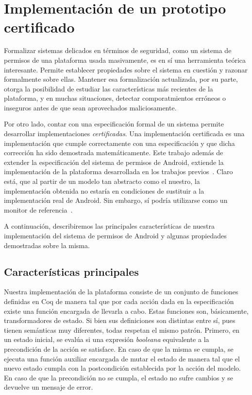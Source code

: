 \chapter{Implementación de un prototipo certificado}
\label{chapter:implementation}
Formalizar sistemas delicados en términos de seguridad, como un sistema de permisos de una
plataforma usada masivamente, es en sí una herramienta teórica interesante. Permite establecer
propiedades sobre el sistema en cuestión y razonar formalmente sobre ellas. Mantener esa
formalización actualizada, por su parte, otorga la posibilidad de estudiar las características más
recientes de la plataforma, y en muchas situaciones, detectar comporatmientos erróneos o inseguros
antes de que sean aprovechados maliciosamente.

Por otro lado, contar con una especificación formal de un sistema permite desarrollar
implementaciones \textit{certificadas}. Una implementación certificada es una implementación que
cumple correctamente con una especificación y que dicha corrección ha sido demostrada
matemáticamente. Este trabajo además de extender la especificación del sistema de permisos de
Android, extiende la implementación de la plataforma desarrollada en los trabajos previos~\cite{betarte-2017,luna-cleiej}. Claro está, que al partir de un modelo tan abstracto como el
nuestro, la implementación obtenida no estaría en condiciones de sustituir a la implementación real
de Android. Sin embargo, sí podría utilizarse como un monitor de referencia~\cite{Anderson:1972}.

A continuación, describiremos las principales características de nuestra implementación del sistema
de permisos de Android y algunas propiedades demostradas sobre la misma.

\section{Características principales}
Nuestra implementación de la plataforma consiste de un conjunto de funciones definidas en Coq de
manera tal que por cada acción dada en la especificación existe una función encargada de llevarla a
cabo. Estas funciones son, básicamente, transformadores de estado. Si bien sus definiciones son
distintas entre sí, pues tienen semánticas muy diferentes, todas respetan el mismo patrón. Primero,
en un estado inicial, se evalúa si una expresión \textit{booleana} equivalente a la precondición de
la acción se satisface. En caso de que la misma se cumpla, se ejecuta una función auxiliar
encargada de mutar el estado de manera tal que el nuevo estado cumpla con la postcondición
establecida por la acción del modelo. En caso de que la precondición no se cumpla, el estado no
sufre cambios y se devuelve un mensaje de error.

